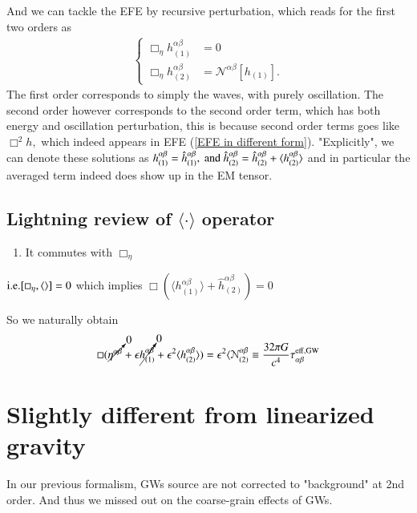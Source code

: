 \documentclass[a4paper, 12pt]{article}
\begin{document}
And we can tackle the EFE by recursive perturbation, which reads for the
first two orders as 
\begin{align}
  \label{perturbation on EFE}
 \begin{cases} 
   \Box_{\eta} h^{\alpha \beta}_{(1)} &= 0  \\
   \Box_{\eta} h^{\alpha \beta}_{(2)} &= \mathcal{N}^{\alpha \beta} [
   h_{(1)}].
 \end{cases} 
\end{align}
The first order corresponds to simply the waves, with purely oscillation.
The second order however corresponds to the second order term, which has
both energy and oscillation perturbation, this is because second order terms
goes like \( \Box^2 h, \) which indeed appears in EFE (\ref{EFE in different
form}). "Explicitly", we can denote these solutions as \( h^{\alpha
\beta}_{(1)} = \hat{h}^{\alpha \beta}
_{(1)}, \textnormal{ and } \hat{h}
^{\alpha\beta}_{(2)} = \hat{h}
^{\alpha \beta}_{(2)}  + \langle h_{(2)}^{\alpha \beta} \rangle \)
and in particular the averaged term indeed does show up in the EM tensor. 

\subsection{Lightning review of \( \langle \cdot \rangle \)
operator}%
  \label{sub:Lightning review of \( \langle \cdot \rangle \) operator}
 \begin{enumerate}
   \item[\cdot] It commutes with \( \Box_{\eta} \)
 \end{enumerate} 
 \( \textnormal{i.e.} [  \Box_{\eta}, \langle \rangle ] = 0   \)
 which implies $ \Box(\langle h_{(1)}^{\alpha \beta} \rangle + \hat{h}
 _{(2)}^{\alpha \beta}) = 0$

 So we naturally obtain 
 \begin{align}
  \label{some}
   \Box(\cancelto{0}{\eta^{\alpha \beta}} + \epsilon
   \cancelto{0}{h_{(1)}^{\alpha \beta}} + \epsilon^2 \langle h^{\alpha
   \beta}_{(2)} \rangle  ) = \epsilon^2 \langle
   \mathcal{N}^{\alpha \beta}_{(2)} \equiv \frac{32 \pi G}{c^4}
   \tau_{\alpha \beta}^{\mathrm{eff, GW}} 
 \end{align}

 \section{Slightly different from linearized gravity}%
  \label{sec:Slightly different from linearized gravity}
  In our previous formalism, GWs source are not corrected to
  "background" at 2nd order. And thus we missed out on the coarse-grain
  effects of GWs. 
\end{document}

